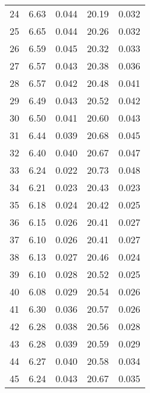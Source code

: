 \begin{table}
\begin{tabular}{c|ll|ll}
24 & 6.63 & 0.044 & 20.19 & 0.032 \\
25 & 6.65 & 0.044 & 20.26 & 0.032 \\
26 & 6.59 & 0.045 & 20.32 & 0.033 \\
27 & 6.57 & 0.043 & 20.38 & 0.036 \\
28 & 6.57 & 0.042 & 20.48 & 0.041 \\
29 & 6.49 & 0.043 & 20.52 & 0.042 \\
30 & 6.50 & 0.041 & 20.60 & 0.043 \\
31 & 6.44 & 0.039 & 20.68 & 0.045 \\
32 & 6.40 & 0.040 & 20.67 & 0.047 \\
33 & 6.24 & 0.022 & 20.73 & 0.048 \\
34 & 6.21 & 0.023 & 20.43 & 0.023 \\
35 & 6.18 & 0.024 & 20.42 & 0.025 \\
36 & 6.15 & 0.026 & 20.41 & 0.027 \\
37 & 6.10 & 0.026 & 20.41 & 0.027 \\
38 & 6.13 & 0.027 & 20.46 & 0.024 \\
39 & 6.10 & 0.028 & 20.52 & 0.025 \\
40 & 6.08 & 0.029 & 20.54 & 0.026 \\
41 & 6.30 & 0.036 & 20.57 & 0.026 \\
42 & 6.28 & 0.038 & 20.56 & 0.028 \\
43 & 6.28 & 0.039 & 20.59 & 0.029 \\
44 & 6.27 & 0.040 & 20.58 & 0.034 \\
45 & 6.24 & 0.043 & 20.67 & 0.035 \\
               \hline
        \end{tabular}
    \end{table}
    \clearpage

